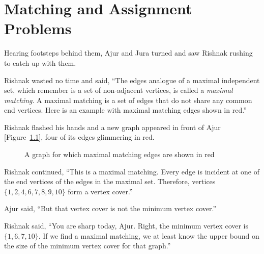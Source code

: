 \chapter{Matching and Assignment Problems}

Hearing footsteps behind them, Ajur and Jura turned and saw Rishnak rushing to catch up with them.

Rishnak wasted no time and said, ``The edges analogue of a maximal independent set, which remember is a set of non-adjacent vertices, is called a \textit{maximal matching}. A maximal matching is a set of edges that do not share any common end vertices. Here is an example with maximal matching edges shown in red.'' 

Rishnak flashed his hands and a new graph appeared in front of Ajur [Figure~\ref{16g1}], four of its edges glimmering in red.

\begin{figure}
\begin{center}

\caption{A graph for which maximal matching edges are shown in red}\label{16g1}
\end{center}
\end{figure}

Rishnak continued, ``This is a maximal matching. Every edge is incident at one of the end vertices of the edges in the maximal set. Therefore, vertices~$\{1,2,4,6,7,8,9,10\}$ form a vertex cover.'' 

Ajur said, ``But that vertex cover is not the minimum vertex cover.''

Rishnak said, ``You are sharp today, Ajur. Right, the minimum vertex cover is~$\{1,6,7,10\}$. If we find a maximal matching, we at least know the upper bound on the size of the minimum vertex cover for that graph.''

